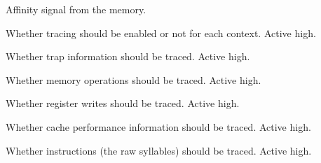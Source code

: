 \ifaceSubGroup{}
Affinity signal from the memory.

\ifaceSubGroup{}
Whether tracing should be enabled or not for each context. Active high.
    
\ifaceSubGroup{}
Whether trap information should be traced. Active high.
    
\ifaceSubGroup{}
Whether memory operations should be traced. Active high.
    
\ifaceSubGroup{}
Whether register writes should be traced. Active high.
    
\ifaceSubGroup{}
Whether cache performance information should be traced. Active high.
    
\ifaceSubGroup{}
Whether instructions (the raw syllables) should be traced. Active high.
